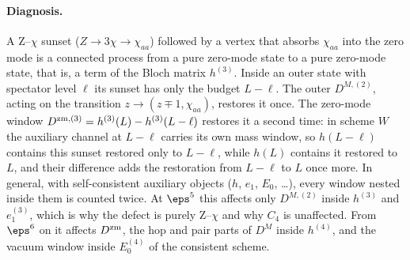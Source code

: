\paragraph{Diagnosis.} A Z--$\chi$ sunset ($Z\to3\chi\to\chi_{aa}$) followed by a vertex that absorbs $\chi_{aa}$ into the zero
mode is a connected process from a pure zero-mode state to a pure zero-mode state, that is, a term of the Bloch matrix
$h^{(3)}$. Inside an outer state with spectator level $\ell$ its sunset has only the budget $L-\ell$. The outer $D^{M,(2)}$,
acting on the transition $z\to(z\mp1,\chi_{aa})$, restores it once. The zero-mode window $D^{{\rm zm},(3)}=h^{(3)}(L)-h^{(3)}(L-\ell)$
restores it a second time: in scheme $W$ the auxiliary channel at $L-\ell$ carries its own mass window, so $h(L-\ell)$
contains this sunset restored only to $L-\ell$, while $h(L)$ contains it restored to $L$, and their difference adds the
restoration from $L-\ell$ to $L$ once more. In general, with self-consistent
auxiliary objects ($h$, $e_1$, $E_0$, \dots), every window nested inside them is counted twice. At $\eps^5$ this affects only
$D^{M,(2)}$ inside $h^{(3)}$ and $e_1^{(3)}$, which is why the defect is purely Z--$\chi$ and why $C_4$ is unaffected. From
$\eps^6$ on it affects $D^{\rm zm}$, the hop and pair parts of $D^M$ inside $h^{(4)}$, and the vacuum window inside
$E_0^{(4)}$ of the consistent scheme.

